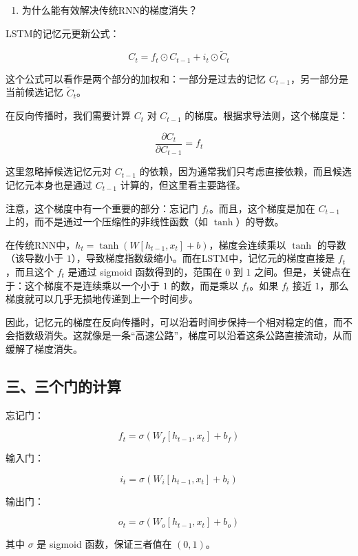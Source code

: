 \begin{enumerate}
\def\labelenumi{\arabic{enumi}.}
\setcounter{enumi}{1}
\tightlist
\item
  为什么能有效解决传统RNN的梯度消失？
\end{enumerate}

LSTM的记忆元更新公式：

\[
C_t = f_t \odot C_{t-1} + i_t \odot \tilde{C}_t
\]

这个公式可以看作是两个部分的加权和：一部分是过去的记忆 \(C_{t-1}\)，另一部分是当前候选记忆 \(\tilde{C}_t\)。

在反向传播时，我们需要计算 \(C_t\) 对 \(C_{t-1}\) 的梯度。根据求导法则，这个梯度是：

\[
\frac{\partial C_t}{\partial C_{t-1}} = f_t
\]

这里忽略掉候选记忆元对 \(C_{t-1}\) 的依赖，因为通常我们只考虑直接依赖，而且候选记忆元本身也是通过 \(C_{t-1}\) 计算的，但这里看主要路径。

注意，这个梯度中有一个重要的部分：忘记门 \(f_t\)。而且，这个梯度是加在 \(C_{t-1}\) 上的，而不是通过一个压缩性的非线性函数（如 \(\tanh\)）的导数。

在传统RNN中，\(h_t = \tanh(W [h_{t-1}, x_t] + b)\)，梯度会连续乘以 \(\tanh\) 的导数（该导数小于 \(1\)），导致梯度指数级缩小。而在LSTM中，记忆元的梯度直接是 \(f_t\)，而且这个 \(f_t\) 是通过 sigmoid 函数得到的，范围在 \(0\) 到 \(1\) 之间。但是，关键点在于：这个梯度不是连续乘以一个小于 \(1\) 的数，而是乘以 \(f_t\)。如果 \(f_t\) 接近 \(1\)，那么梯度就可以几乎无损地传递到上一个时间步。

因此，记忆元的梯度在反向传播时，可以沿着时间步保持一个相对稳定的值，而不会指数级消失。这就像是一条``高速公路''，梯度可以沿着这条公路直接流动，从而缓解了梯度消失。

\hypertarget{ux4e09ux4e09ux4e2aux95e8ux7684ux8ba1ux7b97}{%
\subsection{三、三个门的计算}\label{ux4e09ux4e09ux4e2aux95e8ux7684ux8ba1ux7b97}}

忘记门：

\[
f_t = \sigma(W_f [h_{t-1}, x_t] + b_f)
\]

输入门：

\[
i_t = \sigma(W_i [h_{t-1}, x_t] + b_i)
\]

输出门：

\[
o_t = \sigma(W_o [h_{t-1}, x_t] + b_o)
\]

其中 \(\sigma\) 是 sigmoid 函数，保证三者值在 \((0,1)\)。

